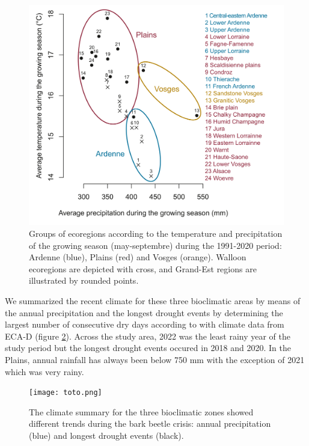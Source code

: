 \documentclass[3p,procedia]{elsarticle}
\begin{document}
\begin{figure}[htbp] 
	\centering
	\includegraphics[width=0.8\linewidth]{climat/climat_region.png}
	\caption{Groups of ecoregions according to the temperature and precipitation of the growing season (may-septembre) during the 1991-2020 period: Ardenne (blue), Plains (red) and Vosges (orange). Walloon ecoregions are depicted with cross, and Grand-Est regions are illustrated by rounded points.}
	\label{fig:clim}
\end{figure}

We summarized the recent climate for these three bioclimatic areas by means of the annual precipitation and the longest drought events by determining the largest number of consecutive dry days according to \cite{schulzweida_2015}  with climate data from ECA-D \citep{ecad} (figure \ref{fig:climECAD}).
Across the study area, 2022 was the least rainy year of the study period but the longest drought events occured in 2018 and 2020.
In the Plains, annual rainfall has always been below 750 mm with the exception of 2021 which was very rainy.

\begin{figure}[htbp] 
	\centering
	\texttt{[image: toto.png]}
	\caption{The climate summary for the three bioclimatic zones showed different trends during the bark beetle crisis: annual precipitation (blue) and longest drought events (black).}
	\label{fig:climECAD}
\end{figure}
\end{document}
